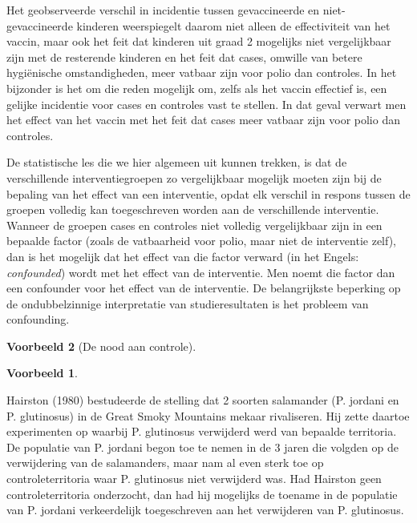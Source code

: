 \documentclass[
  12pt,dutch,coursenotes]{book}
\theoremstyle{definition}
\theoremstyle{definition}
\newtheorem{example}{Voorbeeld}[chapter]
\theoremstyle{definition}
\theoremstyle{remark}
\begin{document}
Het geobserveerde verschil in incidentie tussen gevaccineerde en
niet-gevaccineerde kinderen weerspiegelt daarom niet alleen de effectiviteit
van het vaccin, maar ook het feit dat kinderen uit graad 2 mogelijks niet
vergelijkbaar zijn met de resterende kinderen en het feit dat cases, omwille
van betere hygiënische omstandigheden, meer vatbaar zijn voor polio dan
controles. In het bijzonder is het om die reden mogelijk om, zelfs als het
vaccin effectief is, een gelijke incidentie voor cases en controles vast te
stellen. In dat geval verwart men het effect van het vaccin met het feit dat
cases meer vatbaar zijn voor polio dan controles.

De statistische les die we hier algemeen uit kunnen trekken, is dat de
verschillende interventiegroepen zo vergelijkbaar mogelijk moeten zijn bij
de bepaling van het effect van een interventie, opdat elk verschil in respons tussen
de groepen volledig kan toegeschreven worden aan de verschillende
interventie. Wanneer de groepen cases en controles niet volledig
vergelijkbaar zijn in een bepaalde factor (zoals de vatbaarheid voor polio,
maar niet de interventie zelf), dan is het mogelijk dat het effect van die
factor verward (in het Engels: \emph{confounded}) wordt met het effect van
de interventie. Men noemt die factor dan een confounder voor het effect van
de interventie. De belangrijkste beperking op de ondubbelzinnige interpretatie van studieresultaten is het probleem van confounding.

\begin{example}[De nood aan controle]
\begin{example}

\protect\hypertarget{exm:unnamed-chunk-66}{}{\label{exm:unnamed-chunk-66} \iffalse (De nood aan controle) \fi{} }

\end{example}
\end{example}

Hairston (1980) bestudeerde de stelling dat 2 soorten salamander (P. jordani en P. glutinosus) in de Great Smoky Mountains mekaar rivaliseren. Hij zette daartoe experimenten op waarbij P. glutinosus verwijderd werd van bepaalde territoria. De populatie van P. jordani begon toe te nemen in de 3 jaren die volgden op de verwijdering van de salamanders, maar nam al even sterk toe op controleterritoria waar P. glutinosus niet verwijderd was. Had Hairston geen controleterritoria onderzocht, dan had hij mogelijks de toename in de populatie van P. jordani verkeerdelijk toegeschreven aan het verwijderen van P. glutinosus.
\end{document}
